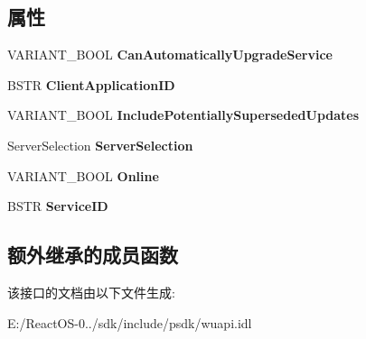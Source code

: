 \subsection*{属性}
\begin{DoxyCompactItemize}
\item 
\mbox{\label{interface_w_u_api_lib_1_1_i_update_searcher_a9768b089609f63c9053107673834d067}} 
V\+A\+R\+I\+A\+N\+T\+\_\+\+B\+O\+OL {\bfseries Can\+Automatically\+Upgrade\+Service}
\item 
\mbox{\label{interface_w_u_api_lib_1_1_i_update_searcher_ace9b86421815abb2b1068a9b5cebe223}} 
B\+S\+TR {\bfseries Client\+Application\+ID}
\item 
\mbox{\label{interface_w_u_api_lib_1_1_i_update_searcher_aa7993849bc1434356fe706604236cefd}} 
V\+A\+R\+I\+A\+N\+T\+\_\+\+B\+O\+OL {\bfseries Include\+Potentially\+Superseded\+Updates}
\item 
\mbox{\label{interface_w_u_api_lib_1_1_i_update_searcher_a144aa206dd99e9de4555a24a166b85d7}} 
Server\+Selection {\bfseries Server\+Selection}
\item 
\mbox{\label{interface_w_u_api_lib_1_1_i_update_searcher_aa550d906ecf003e569e00991ad0411d5}} 
V\+A\+R\+I\+A\+N\+T\+\_\+\+B\+O\+OL {\bfseries Online}
\item 
\mbox{\label{interface_w_u_api_lib_1_1_i_update_searcher_ad05576148c73950be008f05c66021ef4}} 
B\+S\+TR {\bfseries Service\+ID}
\end{DoxyCompactItemize}
\subsection*{额外继承的成员函数}


该接口的文档由以下文件生成\+:\begin{DoxyCompactItemize}
\item 
E\+:/\+React\+O\+S-\/0../sdk/include/psdk/wuapi.\+idl\end{DoxyCompactItemize}
